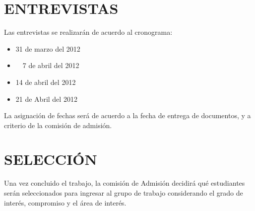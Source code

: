 \documentclass[11pt,letterpaper]{article}
\begin{document}
\section*{\bf \normalsize ENTREVISTAS}
Las entrevistas se realizarán de acuerdo al cronograma:
\begin{itemize}
\item 31 de marzo del 2012
\item ~~7 de abril del 2012
\item 14 de abril del 2012
\item 21 de Abril del 2012
\end{itemize}
La asignación de fechas será de acuerdo a la fecha de entrega de documentos, y a criterio de la comisión de admisión.
\section*{\bf \normalsize SELECCIÓN}
Una vez concluido el trabajo, la comisión de Admisión decidirá qué estudiantes serán seleccionados para ingresar al grupo de trabajo considerando el grado de interés, compromiso y el área  de interés.
\end{document}
